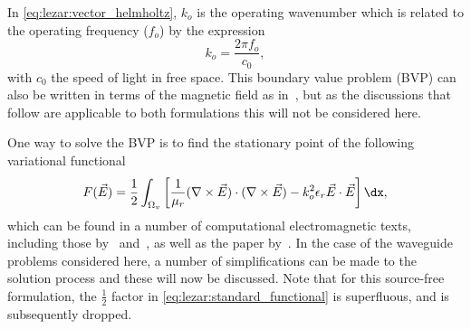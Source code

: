 In \eqref{eq:lezar:vector_helmholtz}, $k_o$ is the operating wavenumber which is related to the operating frequency ($f_o$) by the expression 
\begin{equation}
  \label{eq:lezar:operating_wavenumber}
 k_o = \frac{2\pi f_o}{c_0},
\end{equation}
with $c_0$ the speed of light in free space.  This boundary value problem (BVP) can also be written in terms of the magnetic field as in~\citet{Jin2002}, but as the discussions that follow are applicable to both formulations this will not be considered here.

One way to solve the BVP is to find the stationary point of the following variational functional 
\begin{equation}
  \label{eq:lezar:standard_functional}
  F(\vec{E}) = \frac{1}{2}\int_{\Omega_v} \left[ \frac{1}{\mu_r}(\nabla\times{\vec{E}})\cdot(\nabla\times{\vec{E}}) - k_o^2\epsilon_r\vec{E}\cdot{\vec{E}} \right] \dx,
\end{equation}
which can be found in a number of computational electromagnetic texts, including those by~\citet{Jin2002} and~\citet{PelosiCoccioliSelleri1998}, as well as the paper by~\citet{LeeSunCendes1991}. In the case of the waveguide problems considered here, a number of simplifications can be made to the solution process and these will now be discussed. Note that for this source-free formulation, the $\frac{1}{2}$ factor in \eqref{eq:lezar:standard_functional} is superfluous, and is subsequently dropped. 

